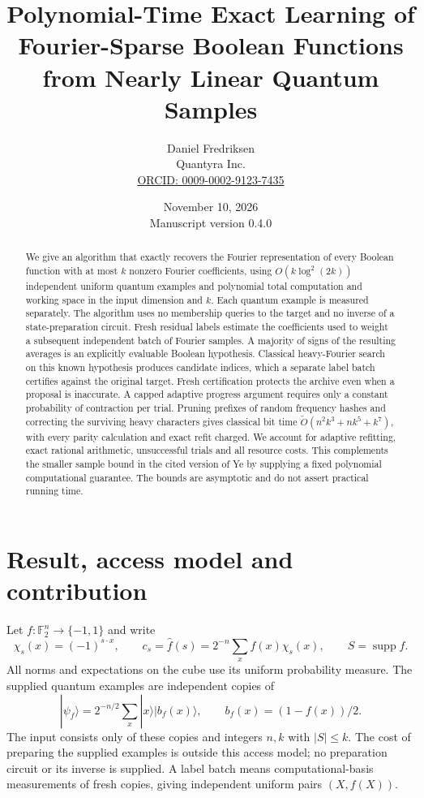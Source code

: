 \documentclass[11pt]{article}
\title{Polynomial-Time Exact Learning of Fourier-Sparse Boolean Functions from Nearly Linear Quantum Samples}
\author{Daniel Fredriksen\\\small Quantyra Inc.\\\small\href{https://orcid.org/0009-0002-9123-7435}{ORCID: 0009-0002-9123-7435}}
\date{November 10, 2026\\\small Manuscript version 0.4.0}
\theoremstyle{remark}\newtheorem{remark}[theorem]{Remark}
\newcommand{\F}{\mathbb F}
\newcommand{\supp}{\operatorname{supp}}
\begin{document}
\maketitle
\begin{abstract}
We give an algorithm that exactly recovers the Fourier representation of every Boolean function with at most $k$ nonzero Fourier coefficients, using $O(k\log^2(2k))$ independent uniform quantum examples and polynomial total computation and working space in the input dimension and $k$. Each quantum example is measured separately. The algorithm uses no membership queries to the target and no inverse of a state-preparation circuit. Fresh residual labels estimate the coefficients used to weight a subsequent independent batch of Fourier samples. A majority of signs of the resulting averages is an explicitly evaluable Boolean hypothesis. Classical heavy-Fourier search on this known hypothesis produces candidate indices, which a separate label batch certifies against the original target. Fresh certification protects the archive even when a proposal is inaccurate. A capped adaptive progress argument requires only a constant probability of contraction per trial. Pruning prefixes of random frequency hashes and correcting the surviving heavy characters gives classical bit time $\widetilde O(n^2k^3+nk^5+k^7)$, with every parity calculation and exact refit charged. We account for adaptive refitting, exact rational arithmetic, unsuccessful trials and all resource costs. This complements the smaller sample bound in the cited version of Ye by supplying a fixed polynomial computational guarantee. The bounds are asymptotic and do not assert practical running time.
\end{abstract}

\section{Result, access model and contribution}
Let $f:\F_2^n\to\{-1,1\}$ and write
\[
 \chi_s(x)=(-1)^{s\cdot x},\qquad
 c_s=\widehat f(s)=2^{-n}\sum_x f(x)\chi_s(x),\qquad
 S=\supp\widehat f.
\]
All norms and expectations on the cube use its uniform probability measure.
The supplied quantum examples are independent copies of
\begin{equation}\label{eq:example}
 |\psi_f\rangle=2^{-n/2}\sum_x |x\rangle|b_f(x)\rangle,
 \qquad b_f(x)=(1-f(x))/2.
\end{equation}
The input consists only of these copies and integers $n,k$ with $|S|\le k$.
The cost of preparing the supplied examples is outside this access model; no preparation circuit or its inverse is supplied.
A label batch means computational-basis measurements of fresh copies, giving independent uniform pairs $(X,f(X))$.
\end{document}
